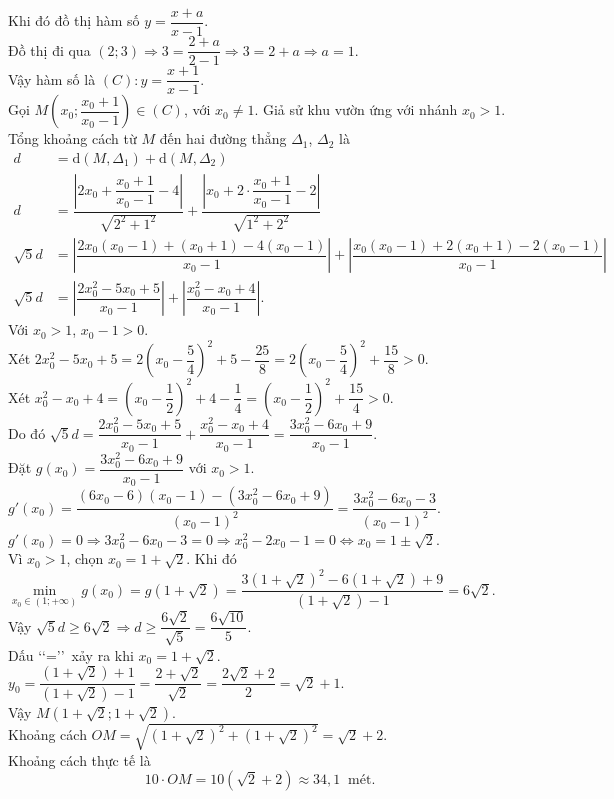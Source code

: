 \begin{bt}
{		Khi đó  đồ thị hàm số $y=\dfrac{x+a}{x-1}$.\\
		 Đồ thị đi qua $(2;3)\Rightarrow 3=\dfrac{2+a}{2-1}\Rightarrow 3=2+a \Rightarrow a=1$.\\
		Vậy hàm số  là $(C)\colon y=\dfrac{x+1}{x-1}$.\\
		Gọi $M\left(x_0;\dfrac{x_0+1}{x_0-1}\right)\in (C)$, với $x_0  \ne 1$. Giả sử khu vườn ứng với nhánh $x_0 > 1$.\\
		Tổng khoảng cách từ $M$ đến  hai đường thẳng $\Delta_1$, $\Delta_2$ là
		\begin{align*}
			 d&=\mathrm{d}\left(M,\Delta_1\right)+\mathrm{d}\left(M,\Delta_2\right)\\
			d&=\dfrac{\left|2x_0+\dfrac{x_0+1}{x_0-1}-4\right|}{\sqrt{2^2+1^2}}+\dfrac{\left|x_0+2\cdot  \dfrac{x_0+1}{x_0-1}-2\right|}{\sqrt{1^2+2^2}}\\
			 \sqrt{5}d&=\left|\dfrac{2x_0(x_0-1)+(x_0+1)-4(x_0-1)}{x_0-1}\right|+\left|\dfrac{x_0(x_0-1)+2(x_0+1)-2(x_0-1)}{x_0-1}\right|\\
			\sqrt{5}d&=\left|\dfrac{2x_0^2-5x_0+5}{x_0-1}\right|+\left|\dfrac{x_0^2-x_0+4}{x_0-1}\right|. 
		\end{align*}
		Với $x_0 > 1$, $x_0-1 > 0$.\\ 
		Xét $2x_0^2-5x_0+5 = 2\left(x_0-\dfrac{5}{4}\right)^2 + 5 - \dfrac{25}{8} = 2\left(x_0-\dfrac{5}{4}\right)^2 +  \dfrac{15}{8} > 0$.\\
		Xét $x_0^2-x_0+4 = \left(x_0-\dfrac{1}{2}\right)^2 + 4 -  \dfrac{1}{4} = \left(x_0-\dfrac{1}{2}\right)^2 + \dfrac{15}{4} > 0$.\\
		Do  đó $\sqrt{5}d=\dfrac{2x_0^2-5x_0+5}{x_0-1}+\dfrac{x_0^2-x_0+4}{x_0-1} = \dfrac{3x_0^2-6x_0+9}{x_0-1}$.\\
		Đặt $g(x_0)=\dfrac{3x_0^2-6x_0+9}{x_0-1}$ với  $x_0 > 1$.\\
		$g'(x_0)=\dfrac{(6x_0-6)(x_0-1)-(3x_0^2-6x_0+9)}{(x_0-1)^2}=\dfrac{3x_0^2-6x_0-3}{(x_0-1)^2}$.\\ 
		$g'(x_0)=0\Rightarrow 3x_0^2-6x_0-3=0 \Rightarrow x_0^2-2x_0-1=0\Leftrightarrow x_0  = 1 \pm \sqrt{2}$.\\
		Vì $x_0 > 1$, chọn $x_0=1+\sqrt{2}$. Khi  đó\\
		$\min\limits_{x_0  \in (1;+\infty)} g(x_0)=g(1+\sqrt{2})= \dfrac{3(1+\sqrt{2})^2-6(1+\sqrt{2})+9}{(1+\sqrt{2})-1}= 6\sqrt{2}$.\\
		Vậy $\sqrt{5}d  \ge 6\sqrt{2} \Rightarrow d \ge \dfrac{6\sqrt{2}}{\sqrt{5}}=\dfrac{6\sqrt{10}}{5}$.\\
		Dấu  \lq\lq =\rq\rq\ xảy ra khi $x_0=1+\sqrt{2}$.\\
		$y_0 = \dfrac{(1+\sqrt{2})+1}{(1+\sqrt{2})-1} =  \dfrac{2+\sqrt{2}}{\sqrt{2}} = \dfrac{2\sqrt{2}+2}{2} = \sqrt{2}+1$.\\
		Vậy $M(1+\sqrt{2};  1+\sqrt{2})$.\\
		Khoảng cách $OM = \sqrt{(1+\sqrt{2})^2+(1+\sqrt{2})^2}= \sqrt{2}+2$.\\ 
		Khoảng cách  thực tế là
		$$10 \cdot OM  = 10(\sqrt{2}+2) \approx 34{,}1~\text{ mét}.$$
	} 
\end{bt}

